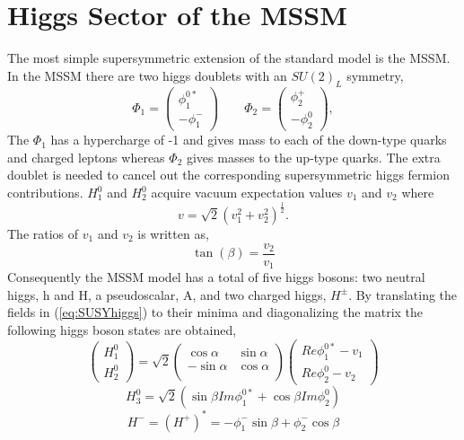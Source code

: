 \section{Higgs Sector of the MSSM}
\label{sec:HiggsMSSM}
The most simple supersymmetric extension of the standard model is the MSSM.
In the MSSM there are two higgs doublets with an $SU(2)_{L}$ symmetry,
\begin{equation}
\Phi_{1}=
\left(
    \begin{array}{c}
      \phi_{1}^{0*} \\
      -\phi_{1}^{-}
    \end{array}
  \right) 
 \qquad
\Phi_{2}=
\left(
    \begin{array}{c}
      \phi_{2}^{+} \\
      -\phi_{2}^{0}
    \end{array}
  \right), 
  \label{eq:SUSYhiggs}
\end{equation}
The $\Phi_{1}$ has a hypercharge of -1 and gives mass to each of the
down-type quarks and charged leptons whereas $\Phi_{2}$ gives masses
to the up-type quarks. The extra doublet
is needed to cancel out the corresponding supersymmetric higgs fermion
contributions.
$H_{1}^{0}$ and $H_{2}^{0}$ acquire vacuum expectation values $v_{1}$ and $v_{2}$ where
\begin{equation}
v = \sqrt{2}(v_{1}^{2}+v_{2}^{2})^{\frac{1}{2}}.
\end{equation}
The ratios of $v_{1}$ and $v_{2}$ is written as,
\begin{equation}
\tan(\beta)=\frac{v_{2}}{v_{1}}
\end{equation}
Consequently the MSSM model has a total of five higgs bosons: two neutral higgs, h and H,
a pseudoscalar, A, and two charged higgs, $H^{\pm}$.
By translating the fields in (\ref{eq:SUSYhiggs}) to their minima and diagonalizing the matrix
the following higgs boson states are obtained,
\begin{equation}
\left(
    \begin{array}{c}
      H^{0}_{1} \\
     H^{0}_{2}
    \end{array}
  \right) 
  =
  \sqrt{2}
  \begin{pmatrix}
  \cos{\alpha} & \sin{\alpha}\\
  -\sin{\alpha}& \cos{\alpha}\\
  \end{pmatrix}
\left(
      \begin{array}{c}
      Re{\phi}_{1}^{0*}-v_{1} \\
     Re{\phi}_{2}^{0}-v_{2}
    \end{array}
  \right) 
\end{equation}
\begin{equation}
H_{3}^{0}=\sqrt{2}(\sin{\beta}Im\phi_{1}^{0*}+\cos{\beta}Im\phi^{0}_{2})
\end{equation}
\begin{equation}
H^{-}=(H^{+})^{*}=-\phi_{1}^{-}\sin{\beta}+\phi_{2}^{-}\cos{\beta}
\end{equation}

